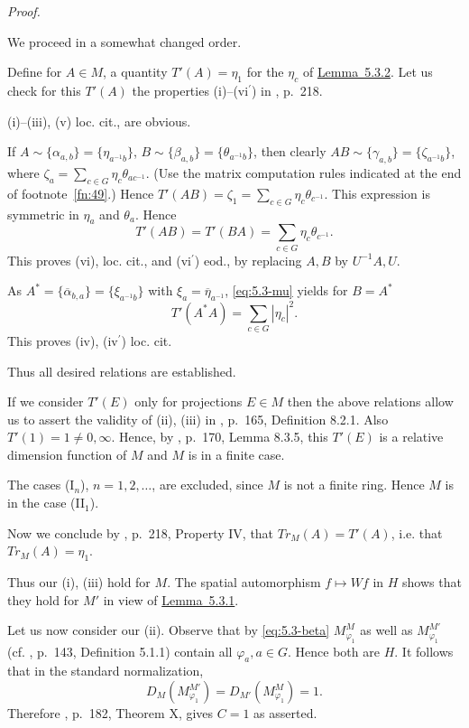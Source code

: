 \documentclass[b5paper,twoside]{article}
\newcommand{\lemref}[2]{\hyperref[#1]{\mbox{Lemma~#2}}}
\theoremstyle{mvnplain}
\renewenvironment{proof}[1][Proof]{%
  \par\addvspace{0.35\baselineskip}%
  \noindent\textit{#1.}\ \normalfont\ignorespaces
}{%
  \par\addvspace{0.35\baselineskip}%
}
\newcommand{\M}{\mathbf M}
\newcommand{\Hilbert}{\mathfrak H}
\def\M{M}%
\def\Hilbert{H}%
\def\operatorname#1{#1}%
\def\mathfrak#1{#1}%
\begin{document}
\begin{proof}
We proceed in a somewhat changed order.

Define for \(A\in\M\), a quantity \(T'(A)=\eta_1\) for the \(\eta_c\) of
\lemref{lem:5.3.2}{5.3.2}. Let us check for this \(T'(A)\) the properties
(i)--(vi\(^{\prime}\)) in \cite{ref6}, p.~218.

(i)--(iii), (v) loc. cit., are obvious.

If \(A\sim\{\alpha_{a,b}\}=\{\eta_{a^{-1}b}\}\),
\(B\sim\{\beta_{a,b}\}=\{\theta_{a^{-1}b}\}\), then clearly
\(AB\sim\{\gamma_{a,b}\}=\{\zeta_{a^{-1}b}\}\), where
\(\zeta_a=\sum_{c\in\mathfrak G}\eta_c\theta_{ac^{-1}}\). (Use the matrix
computation rules indicated at the end of footnote~\ref{fn:49}.) Hence
\(T'(AB)=\zeta_1=\sum_{c\in\mathfrak G}\eta_c\theta_{c^{-1}}\). This
expression is symmetric in \(\eta_a\) and \(\theta_a\). Hence
\begin{equation}\tag{5.3.\(\mu\)}\label{eq:5.3-mu}
 T'(AB)=T'(BA)=\sum_{c\in\mathfrak G}\eta_c\theta_{c^{-1}}.
\end{equation}
This proves (vi), loc. cit., and (vi\(^{\prime}\)) eod., by replacing \(A,B\) by
\(U^{-1}A,U\).

As \(A^*=\{\overline{\alpha}_{b,a}\}=\{\xi_{a^{-1}b}\}\) with
\(\xi_a=\overline{\eta}_{a^{-1}}\), \eqref{eq:5.3-mu} yields for \(B=A^*\)
\begin{equation}\tag{5.3.\(\nu\)}\label{eq:5.3-nu}
 T'(A^*A)=\sum_{c\in\mathfrak G}|\eta_c|^2.
\end{equation}
This proves (iv), (iv\(^{\prime}\)) loc. cit.

Thus all desired relations are established.

If we consider \(T'(E)\) only for projections \(E\in\M\) then the above
relations allow us to assert the validity of (ii), (iii) in
\cite{ref5}, p.~165, Definition 8.2.1. Also
\(T'(1)=1\ne0,\infty\). Hence, by \cite{ref5}, p.~170, Lemma
8.3.5, this \(T'(E)\) is a relative dimension function of \(\M\) and \(\M\)
is in a finite case.

The cases (I\(_n\)), \(n=1,2,\ldots\), are excluded, since \(\M\) is not a
finite ring. Hence \(\M\) is in the case (II\(_1\)).

Now we conclude by \cite{ref6}, p.~218, Property IV, that
\(\operatorname{Tr}_{\M}(A)=T'(A)\), i.e. that
\(\operatorname{Tr}_{\M}(A)=\eta_1\).

Thus our (i), (iii) hold for \(\M\). The spatial automorphism
\(f\mapsto Wf\) in \(\Hilbert\) shows that they hold for \(\M'\) in view of
\lemref{lem:5.3.1}{5.3.1}.

Let us now consider our (ii). Observe that by \eqref{eq:5.3-beta}
\(\mathfrak M^{\M}_{\varphi_1}\) as well as
\(\mathfrak M^{\M'}_{\varphi_1}\) (cf. \cite{ref5}, p.~143,
Definition 5.1.1) contain all \(\varphi_a,a\in\mathfrak G\). Hence both are
\(\Hilbert\). It follows that in the standard normalization,
\[
 D_{\M}(\mathfrak M^{\M'}_{\varphi_1})
 =D_{\M'}(\mathfrak M^{\M}_{\varphi_1})=1.
\]
Therefore \cite{ref5}, p.~182, Theorem X, gives \(C=1\) as
asserted.
\end{proof}
\end{document}
